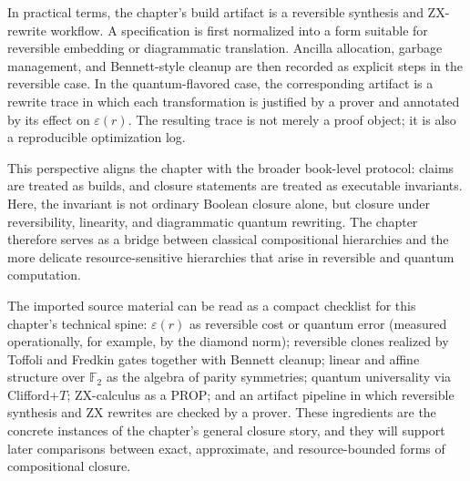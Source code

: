\documentclass[11pt]{article}
\begin{document}
In practical terms, the chapter’s build artifact is a reversible synthesis and ZX-rewrite workflow. A specification is first normalized into a form suitable for reversible embedding or diagrammatic translation. Ancilla allocation, garbage management, and Bennett-style cleanup are then recorded as explicit steps in the reversible case. In the quantum-flavored case, the corresponding artifact is a rewrite trace in which each transformation is justified by a prover and annotated by its effect on \(\varepsilon(r)\). The resulting trace is not merely a proof object; it is also a reproducible optimization log.

This perspective aligns the chapter with the broader book-level protocol: claims are treated as builds, and closure statements are treated as executable invariants. Here, the invariant is not ordinary Boolean closure alone, but closure under reversibility, linearity, and diagrammatic quantum rewriting. The chapter therefore serves as a bridge between classical compositional hierarchies and the more delicate resource-sensitive hierarchies that arise in reversible and quantum computation.

The imported source material can be read as a compact checklist for this chapter’s technical spine: \(\varepsilon(r)\) as reversible cost or quantum error (measured operationally, for example, by the diamond norm); reversible clones realized by Toffoli and Fredkin gates together with Bennett cleanup; linear and affine structure over \(\mathbb{F}_2\) as the algebra of parity symmetries; quantum universality via Clifford+\(T\); ZX-calculus as a PROP; and an artifact pipeline in which reversible synthesis and ZX rewrites are checked by a prover. These ingredients are the concrete instances of the chapter’s general closure story, and they will support later comparisons between exact, approximate, and resource-bounded forms of compositional closure.
\end{document}

